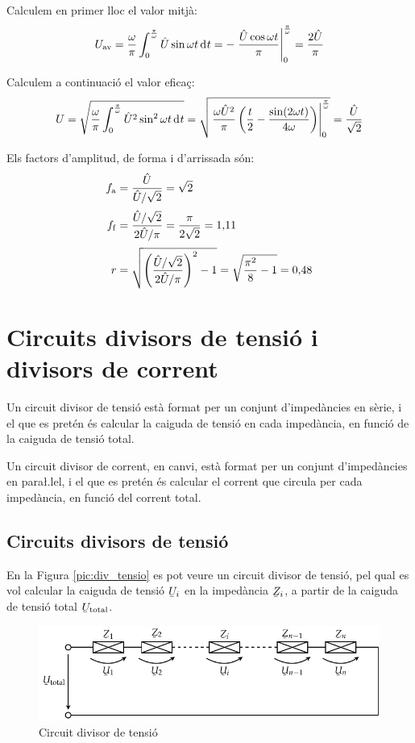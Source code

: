\begin{exemple}
 Calculem en primer lloc el valor mitj\`{a}:
\[
U\ped{av} = \frac{\omega}{\pi} \int_0^\frac{\pi}{\omega} \hat{U}
\sin\omega t \diff t  = - \left. \frac{\hat{U} \cos\omega t}{\pi}
\right|_0^\frac{\pi}{\omega} = \frac{2 \hat{U}}{\pi}
\]

Calculem a continuaci\'{o} el valor efica\c{c}:
\[
U = \sqrt{\frac{\omega}{\pi} \int_0^\frac{\pi}{\omega} \hat{U}^2
\sin^2\omega t \diff t } =   \sqrt{\left.\frac{\omega
\hat{U}^2}{\pi}\left( \frac{t}{2} - \frac{\sin (2\omega t)}{4\omega}
\right)\right|_0^\frac{\pi}{\omega}}  = \frac{\hat{U}}{\sqrt{2}}
\]

Els factors d'amplitud, de forma i d'arrissada s\'{o}n:
\begin{align*}
    f_\mathrm{a} &= \frac{\hat{U}}{\hat{U}/\sqrt{2}} = \sqrt{2} \\[0.5ex]
    f_\mathrm{f} &= \frac{\hat{U}/\sqrt{2}}{2 \hat{U}/\pi} =\frac{\pi}{2\sqrt{2}} =
    1{,}11 \\[0.5ex]
r &= \sqrt{\left(\frac{\hat{U}/\sqrt{2}}{2 \hat{U}/\pi}\right)^2-1}
= \sqrt{\frac{\pi^2}{8}-1} = 0{,}48
\end{align*}

\end{exemple}


\section{Circuits divisors de tensi\'{o} i divisors de corrent}\label{sec:div_tens_corr}

Un circuit divisor de tensi\'{o} est\`{a} format per un conjunt
d'imped\`{a}ncies en s\`{e}rie, i el que es pret\'{e}n \'{e}s calcular la caiguda de
tensi\'{o} en cada imped\`{a}ncia, en funci\'{o} de la caiguda de tensi\'{o} total.

Un circuit divisor de corrent, en canvi, est\`{a} format per un conjunt
d'imped\`{a}ncies en para{\l.l}el, i el que es pret\'{e}n \'{e}s calcular el
corrent que circula per cada imped\`{a}ncia, en funci\'{o} del corrent
total.

\subsection{Circuits divisors de tensi\'{o}}

En la Figura \vref{pic:div_tensio} es pot veure un circuit divisor
de tensi\'{o}, pel qual es vol calcular la caiguda de tensi\'{o}
$\cmplx{U}_i$ en la imped\`{a}ncia $\cmplx{Z}_i$, a partir de la caiguda
de tensi\'{o} total $\cmplx{U}\ped{total}$.
\begin{figure}[htb]
\centering
    \includegraphics{Imatges/Cap-Fonaments-Divisor-Tensio.pdf}
\caption{Circuit divisor de tensi\'{o}} \label{pic:div_tensio}
\end{figure}


